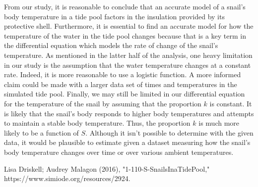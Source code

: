\documentclass{article}
\begin{document}
   From our study, it is reasonable to conclude that an accurate model of a snail's body temperature in a tide pool factors in the insulation provided by its protective shell.
   Furthermore, it is essential to find an accurate model for how the temperature of the water in the tide pool changes because that is a key term in the differential equation which models the rate of change of the snail's temperature.
   As mentioned in the latter half of the analysis, one heavy limitation in our study is the assumption that the water temperature changes at a constant rate.
   Indeed, it is more reasonable to use a logistic function.
   A more informed claim could be made with a larger data set of times and temperatures in the simulated tide pool.
   Finally, we may still be limited in our differential equation for the temperature of the snail by assuming that the proportion \(k\) is constant.
   It is likely that the snail's body responds to higher body temperatures and attempts to maintain a stable body temperature.
   Thus, the proportion \(k\) is much more likely to be a function of \(S\).
   Although it isn't possible to determine with the given data, it would be plausible to estimate given a dataset measuring how the snail's body temperature changes over time or over various ambient temperatures.



   \begin{thebibliography}{999}
      Lisa Driskell; Audrey Malagon (2016), "1-110-S-SnailsInaTidePool,"
      https://www.simiode.org/resources/2924.
   \end{thebibliography}
\end{document}
